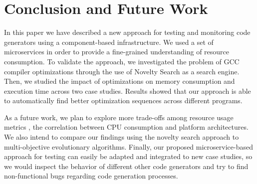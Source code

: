 \section{Conclusion and Future Work}

In this paper we have described a new approach for testing and monitoring code generators using a component-based infrastructure. 
We used a set of microservices in order to provide a fine-grained understanding of resource consumption. 
To validate the approach, we investigated the problem of GCC compiler optimizations through the use of Novelty Search as a search engine.  Then, we studied the impact of optimizations on memory consumption and execution time across two case studies. 
Results showed that our approach is able to automatically find better optimization sequences across different programs.

As a future work, we plan to explore more trade-offs among resource usage metrics \eg, the correlation between CPU consumption and platform architectures. 
We also intend to compare our findings using the novelty search approach to multi-objective evolutionary algorithms. 
Finally, our proposed microservice-based approach for testing can easily be adapted and integrated to new case studies, so we would inspect the behavior of different other code generators and try to find non-functional bugs regarding code generation processes.



